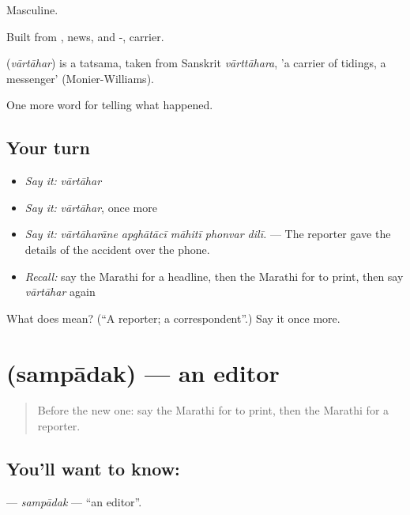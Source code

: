 Masculine.

Built from , news, and -, carrier.

\begin{cousinweb}
\textbf{} (\emph{vārtāhar}) is a tatsama, taken from Sanskrit \emph{vārttāhara}, 'a carrier of tidings, a messenger' (Monier-Williams).
\end{cousinweb}

\begin{grammarlens}[title={What you've built}]
One more word for telling what happened.
\end{grammarlens}

\subsection*{Your turn}
\begin{itemize}
\raggedright
  \item \emph{Say it:} \emph{vārtāhar}
  \item \emph{Say it:} \emph{vārtāhar}, once more
  \item \emph{Say it:} \emph{vārtāharāne apghātācī māhitī phonvar dilī.} — The reporter gave the details of the accident over the phone.
  \item \emph{Recall:} say the Marathi for a headline, then the Marathi for to print, then say \emph{vārtāhar} again
\end{itemize}

\begin{tcolorbox}[breakable,colback=teal!4,colframe=teal!35!black,title={Before you move on}]
What does  mean? (\textquotedblleft{}A reporter; a correspondent\textquotedblright{}.) Say it once more.
\end{tcolorbox}
\section[\texorpdfstring{\mr{संपादक} (sampādak)}{संपादक (sampādak)}]{ (sampādak) — an editor}

\label{lesson:MR-C311-sampadak}



\begin{quote}
Before the new one: say the Marathi for to print, then the Marathi for a reporter.
\end{quote}

\subsection*{You'll want to know: }
\textbf{} — \emph{sampādak} — \textquotedblleft{}an editor\textquotedblright{}.

